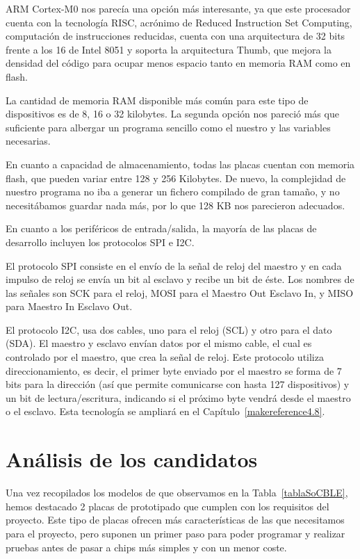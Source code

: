 ARM Cortex-M0 nos parecía una opción más interesante, ya que este procesador cuenta con la tecnología RISC, acrónimo de Reduced Instruction Set Computing, computación de instrucciones reducidas, cuenta con una arquitectura de 32 bits frente a los 16 de Intel 8051 y soporta la arquitectura Thumb, que mejora la densidad del código para ocupar menos espacio tanto en memoria RAM como en flash.

La cantidad de memoria RAM disponible más común para este tipo de dispositivos es de 8, 16 o 32 kilobytes. La segunda opción nos pareció más que suficiente para albergar un programa sencillo como el nuestro y las variables necesarias.

En cuanto a capacidad de almacenamiento, todas las placas cuentan con memoria flash, que pueden variar entre 128 y 256 Kilobytes. De nuevo, la complejidad de nuestro programa no iba a generar un fichero compilado de gran tamaño, y no necesitábamos guardar nada más, por lo que 128 KB nos parecieron adecuados.

En cuanto a los periféricos de entrada/salida, la mayoría de las placas de desarrollo incluyen los protocolos SPI e I2C.

El protocolo SPI consiste en el envío de la señal de reloj del maestro y en cada impulso de reloj se envía un bit al esclavo y recibe un bit de éste. Los nombres de las señales son SCK para el reloj, MOSI para el Maestro Out Esclavo In, y MISO para Maestro In Esclavo Out.

El protocolo I2C, usa dos cables, uno para el reloj (SCL) y otro para el dato (SDA). El maestro y esclavo envían datos por el mismo cable, el cual es controlado por el maestro, que crea la señal de reloj. Este protocolo utiliza direccionamiento, es decir, el primer byte enviado por el maestro se forma de 7 bits para la dirección (así que permite comunicarse con hasta 127 dispositivos) y un bit de lectura/escritura, indicando si el próximo byte vendrá desde el maestro o el esclavo. Esta tecnología se ampliará en el Capítulo~\ref{makereference4.8}.

\section{Análisis de los candidatos}
\label{makereference3.3}

Una vez recopilados los modelos de que observamos en la Tabla~\ref{tablaSoCBLE}, hemos destacado 2 placas de prototipado que cumplen con los requisitos del proyecto. Este tipo de placas ofrecen más características de las que necesitamos para el proyecto, pero suponen un primer paso para poder programar y realizar pruebas antes de pasar a chips más simples y con un menor coste. 

